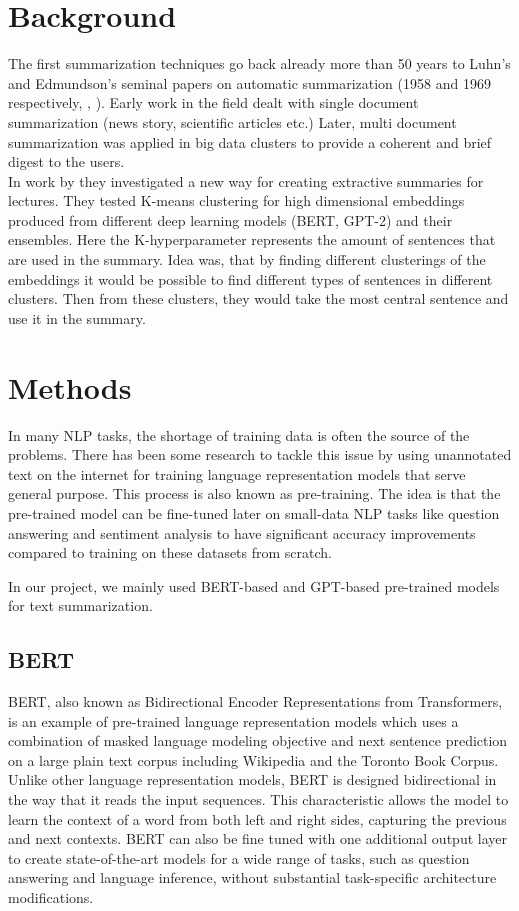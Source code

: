 \documentclass{article}
\begin{document}
\clearpage
\section{Background}
The first summarization techniques go back already more than 50 years to Luhn’s and Edmundson’s seminal papers on automatic summarization (1958 and 1969 respectively, \cite{textmining1958}, \cite{automaticextracting}). Early work in the field dealt with single document summarization (news story, scientific articles etc.) Later, multi document summarization was applied in big data clusters to provide a coherent and brief digest to the users. \\

In work by \cite{extractive_bert} they investigated a new way for creating extractive summaries for lectures. They tested K-means clustering for high dimensional embeddings produced from different deep learning models (BERT, GPT-2) and their ensembles. Here the K-hyperparameter represents the amount of sentences that are used in the summary. Idea was, that by finding different clusterings of the embeddings it would be possible to find different types of sentences in different clusters. Then from these clusters, they would take the most central sentence and use it in the summary. 


\clearpage
\section{Methods}

In many NLP tasks, the shortage of training data is often the source of the problems. There has been some research to tackle this issue by using unannotated text on the internet for training language representation models that serve general purpose. This process is also known as pre-training. The idea is that the pre-trained model can be fine-tuned later on small-data NLP tasks like question answering and sentiment analysis to have significant accuracy improvements compared to training on these datasets from scratch. 

In our project, we mainly used BERT-based and GPT-based pre-trained models for text summarization.

\subsection*{BERT }

BERT, also known as Bidirectional Encoder Representations from Transformers, is an example of pre-trained language representation models which uses a combination of masked language modeling objective and next sentence prediction on a large plain text corpus including Wikipedia and the Toronto Book Corpus. Unlike other language representation models, BERT is designed bidirectional in the way that it reads the input sequences. This characteristic allows the model to learn the context of a word from both left and right sides, capturing the previous and next contexts. BERT can also be fine tuned with one additional output layer to create state-of-the-art models for a wide range of tasks, such as question answering and language inference, without substantial task-specific architecture modifications. \cite{devlin2019bert}
\end{document}
